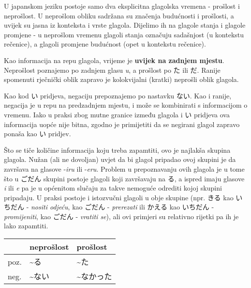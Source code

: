 	U japanskom jeziku postoje samo dva eksplicitna glagolska vremena - prošlost i neprošlost. U neprošlom obliku sadržana su značenja budućnosti i prošlosti, a uvijek su jasna iz konteksta i vrste glagola. Dijelimo ih na glagole stanja i glagole promjene - u neprošlom vremenu glagoli stanja označuju sadašnjost (u kontekstu rečenice), a glagoli promjene budućnost (opet u kontekstu rečenice).
	
	\vspace{5pt}
	Kao informacija na repu glagola, vrijeme je \textbf{uvijek na zadnjem mjestu}. Neprošlost poznajemo po zadnjem glasu \textit{u}, a prošlost po た ili だ. Ranije spomenuti rječnički oblik zapravo je kolokvijalni (kratki) neprošli oblik glagola.
	
	
	Kao kod い pridjeva, negaciju prepoznajemo po nastavku ない. Kao i ranije, negacija je u repu na predzadnjem mjestu, i može se kombinirati s informacijom o vremenu. Iako u praksi zbog mutne granice između glagola i い pridjeva ova informacija uopće nije bitna, zgodno je primijetiti da se negirani glagol zapravo ponaša kao い pridjev.
	
	\newpage
	
	Što se tiče količine informacija koju treba zapamtiti, ovo je najlakša skupina glagola. Nužan (ali ne dovoljan) uvjet da bi glagol pripadao ovoj skupini je da završava na glasove -\textit{iru} ili -\textit{eru}. Problem u prepoznavanju ovih glagola je u tome što u ごだん skupini postoje glagoli koji završavaju na る, a ispred imaju glasove \textit{i} ili \textit{e} pa je u općenitom slučaju za takve nemoguće odrediti kojoj skupini pripadaju. U praksi postoje i istozvučni glagoli u obje skupine (npr. きる kao いちだん - \textit{nositi odjeću}, kao ごだん - \textit{prerezati} ili かえる kao いちだん - \textit{promijeniti}, kao ごだん - \textit{vratiti se}), ali ovi primjeri su relativno rijetki pa ih je lako zapamtiti.
	
	\begin{table}[h]
		\centering
		\begin{tabular}{l l l}\toprule[2pt]
			& neprošlost & prošlost\\
			\midrule
			poz. & \textasciitilde る & \textasciitilde た\\
			neg. & \textasciitilde ない & \textasciitilde なかった\\
			\bottomrule[2pt]
		\end{tabular}
	\end{table}

